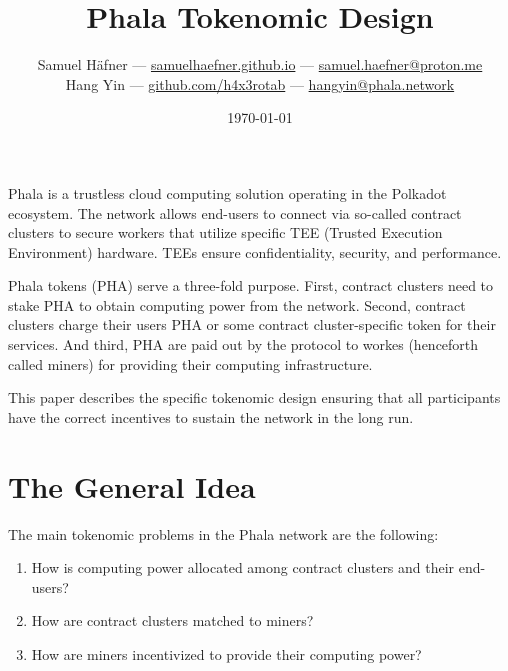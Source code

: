 \documentclass[11pt, a4paper, twocolumn]{article}
\begin{document}
	\title{Phala Tokenomic Design}
	\author{
		Samuel Häfner --- \href{https:\\samuelhaefner.github.io}{samuelhaefner.github.io} --- \href{mailto:samuel.haefner@protonmail.com}{samuel.haefner@proton.me}\\
		Hang Yin --- \href{https://github.com/h4x3rotab}{github.com/h4x3rotab} --- \href{mailto:hangyin@phala.network}{hangyin@phala.network}
	}
	\date{\today}
	
	\maketitle

	
Phala is a trustless cloud computing solution operating in the Polkadot ecosystem. The network allows end-users to connect via so-called contract clusters to secure workers that utilize specific TEE (Trusted Execution Environment) hardware. TEEs ensure confidentiality, security, and performance.

Phala tokens (PHA) serve a three-fold purpose. First, contract clusters need to stake PHA to obtain computing power from the network. Second, contract clusters charge their users PHA or some contract cluster-specific token for their services. And third, PHA are paid out by the protocol to workes (henceforth called miners)  for providing their computing infrastructure. 

This paper describes the specific tokenomic design ensuring that all participants have the correct incentives to sustain the network in the long run. 


\section{The General Idea} 
The main tokenomic problems in the Phala network are the following: 
%
\begin{enumerate}
	\item How is computing power allocated among contract clusters and their end-users?
	\item How are contract clusters matched to miners?
	\item How are miners incentivized to provide their computing power?
\end{enumerate}

\end{document}
